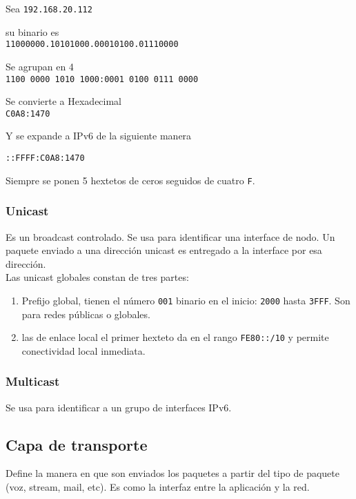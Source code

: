 Sea \texttt{192.168.20.112}

su binario es\\

\texttt{11000000.10101000.00010100.01110000}

Se agrupan en 4\\

\texttt{1100 0000 1010 1000:0001 0100 0111 0000}

Se convierte a Hexadecimal\\

\texttt{C0A8:1470}

Y se expande a IPv6 de la siguiente manera

\texttt{::FFFF:C0A8:1470}

Siempre se ponen 5 hextetos de ceros seguidos de cuatro \texttt{F}.\\

\subsubsection{Unicast}
Es un broadcast controlado. Se usa para identificar una interface de nodo. Un paquete enviado a una dirección unicast es entregado a la interface por esa dirección. \\

Las unicast globales constan de tres partes:

\begin{enumerate}
    \item Prefijo global, tienen el número \texttt{001} binario en el inicio: \texttt{2000} hasta \texttt{3FFF}. Son para redes públicas o globales.
    \item las de enlace local el primer hexteto da en el rango \texttt{FE80::/10} y permite conectividad local inmediata.
\end{enumerate}




\subsubsection{Multicast}

Se usa para identificar a un grupo de interfaces IPv6.


\subsection{Capa de transporte}

Define la manera en que son enviados los paquetes a partir del tipo de paquete (voz, stream, mail, etc). Es como la interfaz entre la aplicación y la red. 

